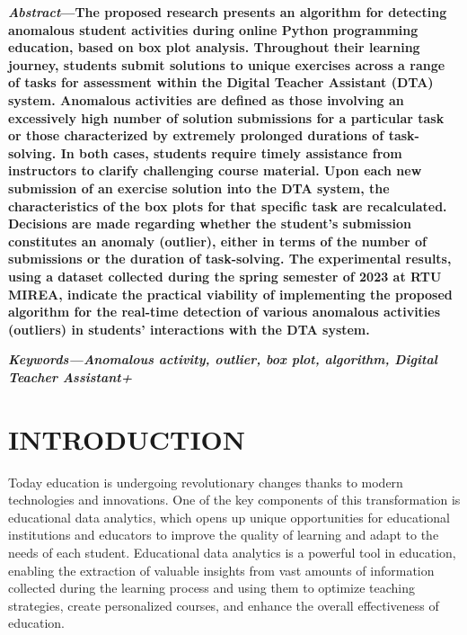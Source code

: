 \documentclass{article}
\begin{document}
\begin{multicols}{2}
  \begin{justify}
    \begin{small}
      \textbf{
        \textit{Abstract}---The proposed research presents an algorithm for detecting anomalous student activities during online Python programming education, based on box plot analysis. Throughout their learning journey, students submit solutions to unique exercises across a range of tasks for assessment within the Digital Teacher Assistant (DTA) system. Anomalous activities are defined as those involving an excessively high number of solution submissions for a particular task or those characterized by extremely prolonged durations of task-solving. In both cases, students require timely assistance from instructors to clarify challenging course material. Upon each new submission of an exercise solution into the DTA system, the characteristics of the box plots for that specific task are recalculated. Decisions are made regarding whether the student's submission constitutes an anomaly (outlier), either in terms of the number of submissions or the duration of task-solving. The experimental results, using a dataset collected during the spring semester of 2023 at RTU MIREA, indicate the practical viability of implementing the proposed algorithm for the real-time detection of various anomalous activities (outliers) in students' interactions with the DTA system.
      }

      \textbf{
        \textit{Keywords---Anomalous activity, outlier, box plot, algorithm, Digital Teacher Assistant+}
      }
      \end{small}

      \section{INTRODUCTION}
      Today education is undergoing revolutionary changes thanks to modern technologies and innovations. One of the key components of this transformation is educational data analytics, which opens up unique opportunities for educational institutions and educators to improve the quality of learning and adapt to the needs of each student. Educational data analytics is a powerful tool in education, enabling the extraction of valuable insights from vast amounts of information collected during the learning process and using them to optimize teaching strategies, create personalized courses, and enhance the overall effectiveness of education.
      

\end{justify}
\end{multicols}
\end{document}
